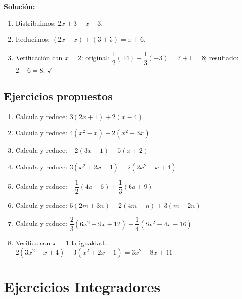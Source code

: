 \documentclass[12pt, letterpaper]{article}
\begin{document}
\begin{cuadrosolucion}
  \textbf{Solución:}
  \begin{enumerate}
    \item Distribuimos: $2x + 3 - x + 3$.
    \item Reducimos: $(2x - x) + (3 + 3) = x + 6$.
    \item Verificación con $x = 2$: original: $\dfrac{1}{2}(14) - \dfrac{1}{3}(-3) = 7 + 1 = 8$; resultado: $2 + 6 = 8$. $\checkmark$
  \end{enumerate}
\end{cuadrosolucion}

\subsection{Ejercicios propuestos}

\begin{enumerate}[leftmargin=*, resume]
  \item \facil{} Calcula y reduce: $3(2x + 1) + 2(x - 4)$

  \item \facil{} Calcula y reduce: $4(x^2 - x) - 2(x^2 + 3x)$

  \item \medio{} Calcula y reduce: $-2(3x - 1) + 5(x + 2)$

  \item \medio{} Calcula y reduce: $3(x^2 + 2x - 1) - 2(2x^2 - x + 4)$

  \item \medio{} Calcula y reduce: $-\dfrac{1}{2}(4a - 6) + \dfrac{1}{3}(6a + 9)$

  \item \medio{} Calcula y reduce: $5(2m + 3n) - 2(4m - n) + 3(m - 2n)$

  \item \dificil{} Calcula y reduce: $\dfrac{2}{3}(6x^2 - 9x + 12) - \dfrac{1}{4}(8x^2 - 4x - 16)$

  \item \dificil{} Verifica con $x = 1$ la igualdad: $2(3x^2 - x + 4) - 3(x^2 + 2x - 1) = 3x^2 - 8x + 11$
\end{enumerate}

\section{Ejercicios Integradores}
\end{document}
